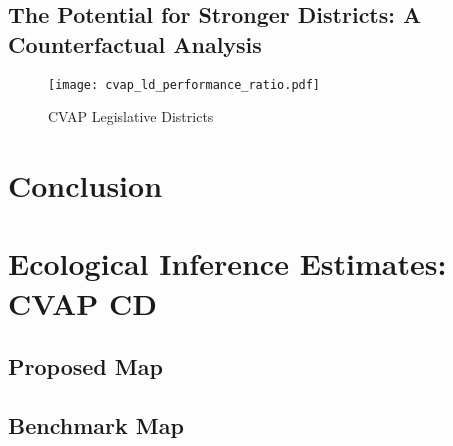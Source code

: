 \documentclass[12pt]{scrartcl}
\begin{document}
\subsection{The Potential for Stronger Districts: A Counterfactual Analysis}

\begin{figure}[ht]
\begin{centering}
\texttt{[image: cvap\_ld\_performance\_ratio.pdf]}
\caption{CVAP Legislative Districts}
\end{centering}
\end{figure}

\section{Conclusion}

\singlespacing

\newpage




\appendix
\renewcommand*\appendixpagename{\section*{Appendix}}
\appendixpage

\section{Ecological Inference Estimates: CVAP CD}
\subsection{Proposed Map}
















\subsection{Benchmark Map}
\clearpage



\end{document}

